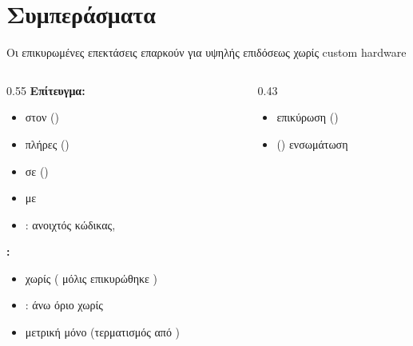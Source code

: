\section{Συμπεράσματα}

\begin{frame}{Οι επικυρωμένες επεκτάσεις  επαρκούν για υψηλής επιδόσεως  χωρίς custom hardware}
  \begin{columns}[T]
    \begin{column}{0.55\textwidth}
      \textbf{Επίτευγμα:}
      \begin{itemize}
        \item {} στον \polymul ()
        \item {} πλήρες \KEM ()
        \item {} σε  ()
        \item {} με 
        \item {}: ανοιχτός κώδικας, 
      \end{itemize}
      \vspace{0.5em}
      \textbf{:}
      \begin{itemize}\small
        \item {} χωρίς  ( μόλις επικυρώθηκε )
        \item {}: άνω όριο χωρίς 
        \item \instret μετρική μόνο (τερματισμός  από )
      \end{itemize}
    \end{column}
    \begin{column}{0.43\textwidth}
      \vspace{0.5em}
      \begin{block}{}
        \begin{itemize}\small
          \item {} επικύρωση ()
          \item {} () ενσωμάτωση

\end{itemize}
\end{block}
\end{column}
\end{columns}
\end{frame}
